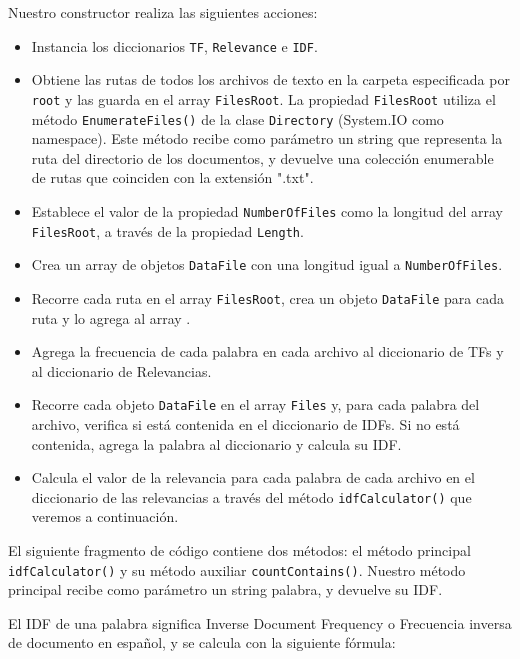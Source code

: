 \documentclass[12pt,a4paper]{report}
\begin{document}
Nuestro constructor realiza las siguientes acciones:
\begin{itemize}
\item Instancia los diccionarios \texttt{TF}, \texttt{Relevance} e \texttt{IDF}.

\item Obtiene las rutas de todos los archivos de texto en la carpeta especificada por \texttt{root} y las guarda en el array \texttt{FilesRoot}. La propiedad \texttt{FilesRoot} utiliza el método \texttt{EnumerateFiles()} de la clase \texttt{Directory} (System.IO como namespace). Este método recibe como parámetro un string que representa la ruta del directorio de los documentos, y devuelve una colección enumerable de rutas que coinciden con la extensión ".txt".

\item Establece el valor de la propiedad \texttt{NumberOfFiles} como la longitud del array \texttt{FilesRoot}, a través de la propiedad \texttt{Length}.

\item Crea un array de objetos \texttt{DataFile} con una longitud igual a \texttt{NumberOfFiles}.

\item Recorre cada ruta en el array \texttt{FilesRoot}, crea un objeto \texttt{DataFile} para cada ruta y lo agrega al array .

\item Agrega la frecuencia de cada palabra en cada archivo al diccionario de TFs y al diccionario de Relevancias.

\item Recorre cada objeto \texttt{DataFile} en el array \texttt{Files} y, para cada palabra del archivo, verifica si está contenida en el diccionario de IDFs. Si no está contenida, agrega la palabra al diccionario y calcula su IDF.

\item Calcula el valor de la relevancia para cada palabra de cada archivo en el diccionario de las relevancias a través del método \texttt{idfCalculator()} que veremos a continuación.

\end{itemize}\bigskip

El siguiente fragmento de código contiene dos métodos: el método principal \texttt{idfCalculator()} y su método auxiliar \texttt{countContains()}. Nuestro método principal recibe como parámetro un string palabra, y devuelve su IDF.\par
El IDF de una palabra significa Inverse Document Frequency o Frecuencia inversa de documento en español, y se calcula con la siguiente fórmula:\par
\end{document}
